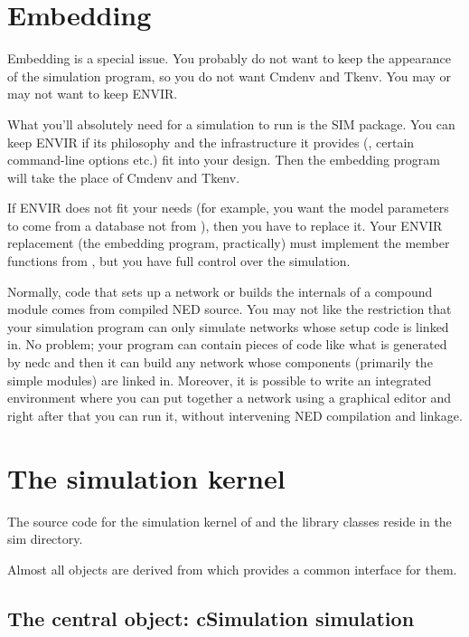 \section{Embedding {\opp}}

Embedding is a special issue. You probably
do not want to keep the appearance of the simulation program, so you
do not want Cmdenv and Tkenv. You may or may not want to keep ENVIR.

What you'll absolutely need for a simulation to run is the SIM 
package. You can keep ENVIR if its philosophy and the infrastructure 
it provides (, certain command-line options etc.) 
fit into your design. Then the embedding program will take the 
place of Cmdenv and Tkenv.

If ENVIR does not fit your needs (for example, you want the model
parameters to come from a database not from ), then you
have to replace it. Your ENVIR replacement (the embedding program,
practically) must implement the  member functions from
, but you have full control over the simulation.

Normally, code that sets up a network or builds the internals of a
compound module comes from compiled NED source.  You may not like the
restriction that your simulation program can only simulate networks
whose setup code is linked in. No problem; your program can contain
pieces of code like what is generated by nedc and then it can build
any network whose components (primarily the simple modules) are linked
in. Moreover, it is possible to write an integrated environment where
you can put together a network using a graphical editor and right
after that you can run it, without intervening NED compilation and
linkage.





\section{The simulation kernel}

The source code for the simulation kernel of
{\opp} and the library classes reside in the sim directory.

Almost all objects are derived from  which
provides a common interface for them.





\subsection{The central object: cSimulation simulation}

